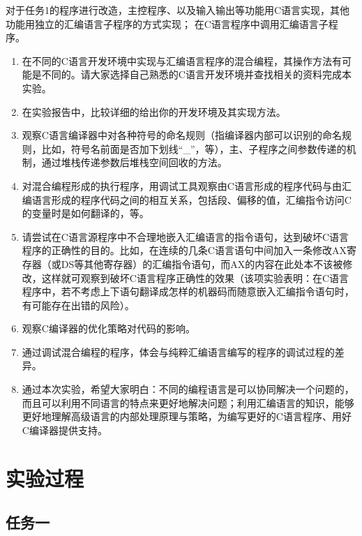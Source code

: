 \documentclass{article}
\begin{document}
	对于任务1的程序进行改造，主控程序、以及输入输出等功能用C语言实现，其他功能用独立的汇编语言子程序的方式实现； 在C语言程序中调用汇编语言子程序。\par
	 \par
	\begin{enumerate}
		\item 在不同的C语言开发环境中实现与汇编语言程序的混合编程，其操作方法有可能是不同的。请大家选择自己熟悉的C语言开发环境并查找相关的资料完成本实验。
		\item 在实验报告中，比较详细的给出你的开发环境及其实现方法。
		\item 观察C语言编译器中对各种符号的命名规则（指编译器内部可以识别的命名规则，比如，符号名前面是否加下划线``\_''，等），主、子程序之间参数传递的机制，通过堆栈传递参数后堆栈空间回收的方法。
		\item 对混合编程形成的执行程序，用调试工具观察由C语言形成的程序代码与由汇编语言形成的程序代码之间的相互关系，包括段、偏移的值，汇编指令访问C的变量时是如何翻译的，等。
		\item 请尝试在C语言源程序中不合理地嵌入汇编语言的指令语句，达到破坏C语言程序的正确性的目的。比如，在连续的几条C语言语句中间加入一条修改AX寄存器（或DS等其他寄存器）的汇编指令语句，而AX的内容在此处本不该被修改，这样就可观察到破坏C语言程序正确性的效果（该项实验表明：在C语言程序中，若不考虑上下语句翻译成怎样的机器码而随意嵌入汇编指令语句时，有可能存在出错的风险）。
		\item 观察C编译器的优化策略对代码的影响。
		\item 通过调试混合编程的程序，体会与纯粹汇编语言编写的程序的调试过程的差异。
		\item 通过本次实验，希望大家明白：不同的编程语言是可以协同解决一个问题的，而且可以利用不同语言的特点来更好地解决问题；利用汇编语言的知识，能够更好地理解高级语言的内部处理原理与策略，为编写更好的C语言程序、用好C编译器提供支持。
	\end{enumerate}

	\section{实验过程}

	\subsection{任务一}
\end{document}
